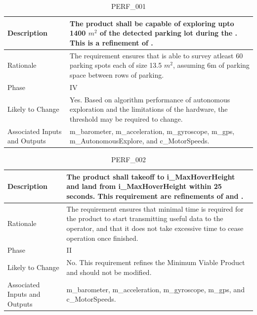 \documentclass{article}
\begin{document}
\begin{table}[!h]
\begin{center}
\caption {PERF\_001} 
\label{PERF_001}
\begin{tabular}{ | m{3cm} | m{11cm} | }
\hline
Description & The product shall be capable of exploring upto 1400 $ m^2 $ of the detected parking lot during the \nameref{Autonomous Explore State}. This is a refinement of \nameref{STA_003}. \\
\hline
Rationale & The requirement ensures that \nameref{Autonomous Explore State} is able to survey atleast 60 parking spots each of size 13.5 $ m^2 $, assuming 6m of parking space between rows of parking. \\
\hline
Phase & IV \\
\hline
Likely to Change & Yes. Based on algorithm performance of autonomous exploration and the limitations of the hardware, the threshold may be required to change. \\
\hline
Associated Inputs and Outputs & m\_barometer, m\_acceleration, m\_gyroscope, m\_gps, m\_AutonomousExplore, and c\_MotorSpeeds.  \\
\hline
\end{tabular}
\end{center}
\end{table}

\begin{table}[!h]
\begin{center}
\caption {PERF\_002} 
\label{PERF_002}
\begin{tabular}{ | m{3cm} | m{11cm} | }
\hline
Description & The product shall takeoff to i\_MaxHoverHeight and land from i\_MaxHoverHeight within 25 seconds. This requirement are refinements of \nameref{STA_001} and \nameref{STA_006}.  \\
\hline
Rationale &  The requirement ensures that minimal time is required for the product to start transmitting useful data to the operator, and that it does not take excessive time to cease operation once finished. \\
\hline
Phase & II \\
\hline
Likely to Change & No. This requirement refines the Minimum Viable Product and should not be modified. \\
\hline
Associated Inputs and Outputs & m\_barometer, m\_acceleration, m\_gyroscope, m\_gps, and c\_MotorSpeeds.  \\
\hline
\end{tabular}
\end{center}
\end{table}
\end{document}
